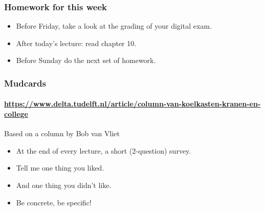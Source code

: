
\begin{frame}
	\frametitle{Homework for this week}
	\begin{itemize}[<+->]
		\item \alert{Before} Friday, take a look at the grading of your digital exam.
		\item \alert{After} today's lecture: read chapter 10.
		\item \alert{Before} Sunday do the next set of homework.
	\end{itemize}
\end{frame}

\begin{frame}
	\frametitle{Mudcards}
	\framesubtitle{\url{https://www.delta.tudelft.nl/article/column-van-koelkasten-kranen-en-college}}

	\begin{block}{Based on a column by Bob van Vliet}
		\begin{itemize}
			\item At the end of every lecture, a short (2-question) survey.
			\item Tell me one thing you liked.
			\item And one thing you didn't like.
			\item Be concrete, be specific!
		\end{itemize}
	\end{block}
\end{frame}

